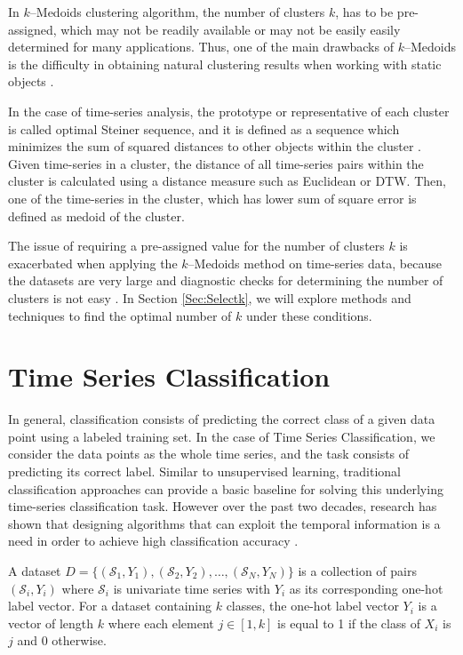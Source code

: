 In $k$--Medoids clustering algorithm, the number of clusters $k$, has to be pre-assigned, which may not be readily available or may not be easily easily determined for many applications. Thus, one of the main drawbacks of $k$--Medoids is the difficulty in obtaining natural clustering results when working with static objects \cite{Mohri2012}.

In the case of time-series analysis, the prototype or representative of each cluster is called optimal Steiner sequence, and it is defined as a sequence which minimizes the sum of squared distances to other objects within the cluster \cite{Kaufman2009}. Given time-series in a cluster, the distance of all time-series pairs within the cluster is calculated using a distance measure such as Euclidean or DTW. Then, one of the time-series in the cluster, which has lower sum of square error is defined as medoid of the cluster.

The issue of requiring a pre-assigned value for the number of clusters $k$ is exacerbated when applying the $k$--Medoids method on time-series data, because the datasets are very large and diagnostic checks for determining the number of clusters is not easy \cite{Aghabozorgi2015}. In Section \ref{Sec:Selectk}, we will explore methods and techniques to find the optimal number of $k$ under these conditions.

\section{Time Series Classification} 
\label{Sec:TimeSeriesClassification}

In general, classification consists of predicting the correct class of a given data point using a labeled training set. In the case of Time Series Classification, we consider the data points as the whole time series, and the task consists of predicting its correct label. Similar to unsupervised learning, traditional classification approaches can provide a basic baseline for solving this underlying time-series classification task. However over the past two decades, research has shown that designing algorithms that can exploit the temporal information is a need in order to achieve high classification accuracy \cite{Fawaz2019}. 

\begin{definition}
A dataset $D=\{(\mathcal{S}_1,Y_1),(\mathcal{S}_2,Y_2), \ldots ,(\mathcal{S}_N,Y_N)\}$ is a collection of pairs $(\mathcal{S}_i,Y_i)$ where $\mathcal{S}_i$ is univariate time series with $Y_i$ as its corresponding one-hot label vector.  For a dataset containing $k$ classes, the one-hot label vector $Y_i$ is a vector of length $k$ where each element $j \in [1,k]$ is equal to 1 if the class of $X_i$ is $j$ and $0$ otherwise.
\end{definition}


